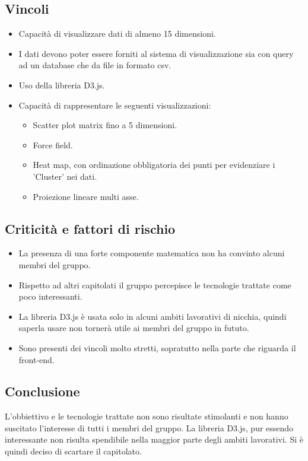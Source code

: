 \subsection{Vincoli}
\begin{itemize}
\item Capacità di visualizzare dati di almeno 15 dimensioni.
\item I dati devono poter essere forniti al sistema di visualizzazione sia con query ad un database che da file in formato csv.
\item Uso della libreria D3.js.
\item Capacità di rappresentare le seguenti visualizzazioni:
\begin{itemize}
	\item Scatter plot matrix fino a 5 dimensioni.
	\item Force field.
	\item Heat map, con ordinazione obbligatoria dei punti per evidenziare i 'Cluster' nei dati.
	\item Proiezione lineare multi asse.
\end{itemize}
\end{itemize}

\subsection{Criticità e fattori di rischio}
\begin{itemize}
\item La presenza di una forte componente matematica non ha convinto alcuni membri del gruppo.
\item Rispetto ad altri capitolati il gruppo percepisce le tecnologie trattate come poco interessanti.
\item La libreria D3.js è usata solo in alcuni ambiti lavorativi di nicchia, quindi saperla usare non tornerà utile ai membri del gruppo in fututo.
\item Sono presenti dei vincoli molto stretti, sopratutto nella parte che riguarda il front-end.
\end{itemize}

\subsection{Conclusione}
L'obbiettivo e le tecnologie trattate non sono risultate stimolanti e non hanno suscitato l'interesse di tutti i membri del gruppo. La libreria D3.js, pur essendo interessante non risulta spendibile nella maggior parte degli ambiti lavorativi. Si è quindi deciso di scartare il capitolato.
